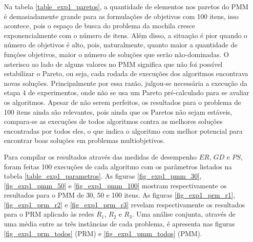 Na tabela \ref{table_exp1_paretos}, a quantidade de elementos nos paretos do PMM é demasiadamente grande para as formulações de objetivos com 100 itens, isso acontece, pois o espaço de busca do problema da mochila cresce exponencialmente com o número de itens. Além disso, a situação é pior quando o número de objetivos é alto, pois, naturalmente, quanto maior a quantidade de funções objetivos, maior o número de soluções que serão não-dominadas. O asterisco ao lado de alguns valores no PMM significa que não foi possível estabilizar o Pareto, ou seja, cada rodada de execuções dos algoritmos encontrava novas soluções. Principalmente por essa razão, julgou-se necessária a execução da etapa 4 de experimentos, onde não se usa um Pareto pré-calculado para se avaliar os algoritmos. Apesar de não serem perfeitos, os resultados para o problema de 100 itens ainda são relevantes, pois ainda que os Paretos não sejam estáveis, compara-se as execuções de todos algoritmos contra as melhores soluções encontradas por todos eles, o que indica o algoritmo com melhor potencial para encontrar boas soluções em problemas multiobjetivos.

Para compilar os resultados através das medidas de desempenho $ER$, $GD$ e $PS$, foram feitas 100 execuções de cada algoritmo com os parâmetros listados na tabela \ref{table_exp1_parametros}. As figuras \ref{fig_exp1_pmm_30}, \ref{fig_exp1_pmm_50} e \ref{fig_exp1_pmm_100} mostram respectivamente os resultados para o PMM de 30, 50 e 100 itens. As figuras \ref{fig_exp1_prm_r1}, \ref{fig_exp1_prm_r2} e \ref{fig_exp1_prm_r3} revelam respectivamente os resultados para o PRM aplicado às redes $R_1$, $R_2$ e $R_3$. Uma análise conjunta, através de uma média entre as três instâncias de cada problema, é apresenta nas figuras \ref{fig_exp1_prm_todos} (PRM) e \ref{fig_exp1_pmm_todos} (PMM).


